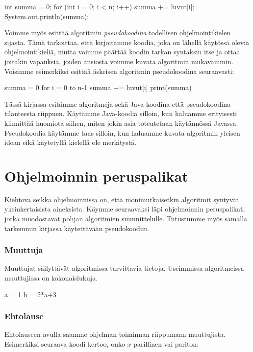 \begin{code}
int summa = 0;
for (int i = 0; i < n; i++) {
    summa += luvut[i];
}
System.out.println(summa);
\end{code}

Voimme myös esittää algoritmin \emph{pseudokoodina}
todellisen ohjelmointikielen sijasta.
Tämä tarkoittaa, että kirjoitamme koodia,
joka on lähellä käytössä olevia ohjelmointikieliä, mutta voimme
päättää koodin tarkan syntaksin itse ja ottaa joitakin vapauksia,
joiden ansiosta voimme kuvata algoritmin mukavammin.
Voisimme esimerkiksi esittää äskeisen algoritmin pseudokoodina seuraavasti:

\begin{code}
summa = 0
for i = 0 to n-1
    summa += luvut[i]
print(summa)
\end{code}

Tässä kirjassa esitämme algoritmeja sekä Java-koodina että pseudokoodina
tilanteesta riippuen.
Käytämme Java-koodia silloin, kun haluamme erityisesti kiinnittää huomiota siihen,
miten jokin asia toteutetaan käytännössä Javassa.
Pseudokoodia käytämme taas silloin, kun haluamme kuvata algoritmin yleisen
idean eikä käytetyllä kielellä ole merkitystä.

\section{Ohjelmoinnin peruspalikat}

Kiehtova seikka ohjelmoinnissa on, että monimutkaisetkin algoritmit
syntyvät yksinkertaisista aineksista.
Käymme seuraavaksi läpi ohjelmoinnin peruspalikat,
jotka muodostavat pohjan algoritmien suunnittelulle.
Tutustumme myös samalla tarkemmin kirjassa käytettävään pseudokoodiin.

\subsubsection{Muuttuja}

Muuttujat säilyttävät algoritmissa tarvittavia tietoja.
Useimmissa algoritmeissa muuttujissa on kokonaislukuja.

\begin{code}
a = 1
b = 2*a+3
\end{code}

\subsubsection{Ehtolause}

Ehtolauseen avulla saamme ohjelman toiminnan
riippumaan muuttujista.
Esimerkiksi seuraava koodi kertoo, onko $x$ parillinen vai pariton:

